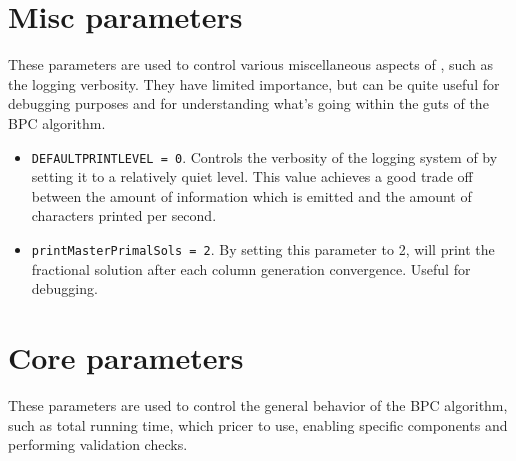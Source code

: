 \section{Misc parameters}
These parameters are used to control various miscellaneous aspects of \bapcod{},
such as the logging verbosity.
They have limited importance, but can be quite useful for debugging purposes
and for understanding what's going within the guts of the BPC algorithm.

\begin{itemize}
	\item \texttt{DEFAULTPRINTLEVEL = 0}.
	      Controls the verbosity of the logging system of \bapcod{} by setting it to a relatively quiet level.
	      This value achieves a good trade off between the amount of information which is emitted
	      and the amount of characters printed per second.
	\item \texttt{printMasterPrimalSols = 2}.
	      By setting this parameter to 2, \bapcod{} will print the fractional solution after each column generation convergence.
	      Useful for debugging.
\end{itemize}

\section{Core parameters}
These parameters are used to control the general behavior of the BPC algorithm,
such as total running time, which pricer to use, enabling specific
components and performing validation checks.

